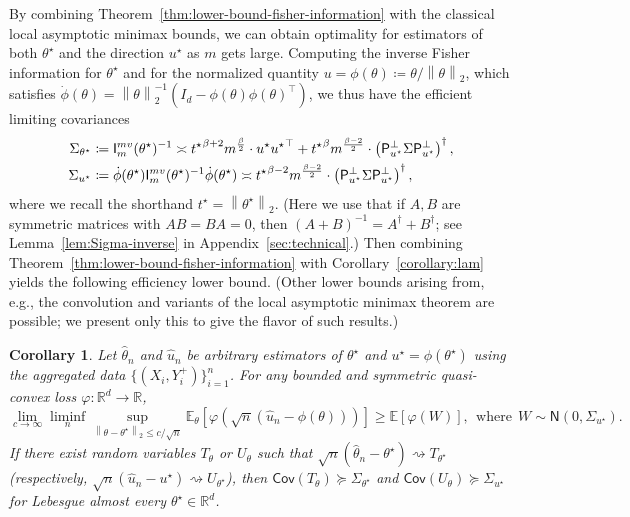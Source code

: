\documentclass[11pt]{article}
\newcommand{\cov}{\mathsf{Cov}}
\newcommand{\E}{\mathbb{E}}
\newcommand{\R}{\mathbb{R}} %
\newcommand{\prn}[1]{\left({#1}\right)} %
\newcommand{\norm}[1]{\left\|{#1}\right\|} %
\newcommand{\what}[1]{\widehat{#1}}
\newcommand{\majY}{Y^+}
\newcommand{\normal}{\mathsf{N}}
\newcommand{\proj}{\mathsf{P}}
\newcommand{\ltwo}[1]{\norm{#1}_2} %
\newcommand{\<}{\langle} %
\renewcommand{\>}{\rangle}
\newcommand{\cd}{\rightsquigarrow}
\newcommand{\defeq}{\coloneqq}
\newcommand{\opt}{^\star}
\newtheorem{corollary}{Corollary}
\begin{document}
By combining Theorem~\ref{thm:lower-bound-fisher-information}
with the classical local asymptotic minimax bounds, we can obtain
optimality for estimators of both $\theta\opt$ and the direction
$u\opt$ as $m$ gets large.
Computing the inverse Fisher information for $\theta\opt$ and
for the normalized quantity $u = \phi(\theta) \defeq \theta / \ltwo{\theta}$,
which satisfies $\dot{\phi}(\theta) = \ltwo{\theta}^{-1}
(I_d - \phi(\theta) \phi(\theta)^\top)$, we thus have the
efficient limiting covariances
\begin{align*}
  \Sigma_{\theta\opt} & \defeq
  \fishermv_m(\theta\opt)^{-1}  \asymp {t\opt}^{\beta +2} m^{\frac{\beta}{2}} \cdot u\opt {u\opt}^\top +  {t\opt}^{\beta}m^{\frac{\beta-2}{2}}  \cdot \prn{\proj_{u\opt}^\perp \Sigma \proj_{u\opt}^\perp}^\dagger, \\
  \Sigma_{u\opt} & \defeq \dot{\phi}(\theta\opt)
  \fishermv_m(\theta\opt)^{-1} \dot{\phi}(\theta\opt)
  \asymp {t\opt}^{\beta-2 }m^{\frac{\beta-2}{2}}  \cdot \prn{\proj_{u\opt}^\perp \Sigma \proj_{u\opt}^\perp}^\dagger,
\end{align*}
where we recall the shorthand $t\opt = \ltwo{\theta\opt}$.
(Here we use that if $A, B$ are symmetric matrices with $AB = BA = 0$,
then $(A + B)^{-1} = A^\dagger + B^\dagger$; see Lemma~\ref{lem:Sigma-inverse}
in Appendix~\ref{sec:technical}.)
Then combining Theorem~\ref{thm:lower-bound-fisher-information} with
Corollary~\ref{corollary:lam} yields the following efficiency
lower bound. (Other lower bounds arising from, e.g., the convolution
and variants of the local asymptotic minimax theorem are possible;
we present only this to give the flavor of such results.)
\begin{corollary} \label{cor:LAM-lower-bounds}
  Let $\what{\theta}_n$ and $\what{u}_n$
  be arbitrary estimators of $\theta\opt$ and $u\opt = \phi(\theta\opt)$
  using the aggregated data $\{(X_i,
  \majY_i)\}_{i=1}^n$.
  For any bounded and symmetric quasi-convex loss $\varphi : \R^d \to \R$,
  \begin{equation*}
    \lim_{c \to \infty}
    \liminf_n \sup_{\ltwo{\theta - \theta\opt} \le c/\sqrt{n}}
    \E_\theta[\varphi(\sqrt{n}(\what{u}_n - \phi(\theta)))]
    \ge \E[\varphi(W)],
    ~~ \mbox{where} ~~
    W \sim \normal(0, \Sigma_{u\opt}).
  \end{equation*}
  If there exist random variables
  $T_\theta$ or $U_\theta$
  such that $\sqrt{n}(\what{\theta}_n - \theta\opt) \cd T_{\theta\opt}$
  (respectively, $\sqrt{n}(\what{u}_n - u\opt) \cd U_{\theta\opt}$),
  then
  $\cov(T_\theta) \succeq \Sigma_{\theta\opt}$ and $\cov(U_\theta) \succeq
  \Sigma_{u\opt}$ for Lebesgue almost every $\theta\opt \in \R^d$.
\end{corollary}
\end{document}
